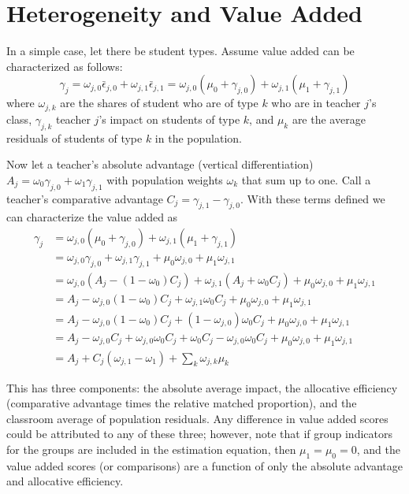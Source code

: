 \documentclass[letterpaper,12pt]{article}
\begin{document}
\section{Heterogeneity and Value Added}

In a simple case, let there be student types. Assume value added can be characterized as follows:
\[
\gamma_j = \omega_{j,0}\bar{\epsilon}_{j,0}  + \omega_{j,1}\bar{\epsilon}_{j,1} =  \omega_{j,0}(\mu_0 +\gamma_{j,0}) + \omega_{j,1}(\mu_1 +\gamma_{j,1})
\]
\noindent where $\omega_{j,k}$ are the shares of student who are of type $k$ who are in teacher $j$'s class, $\gamma_{j,k}$ teacher $j$'s  impact on students of type $k$, and $\mu_k$ are the average residuals of students of type $k$ in the population.

Now let a teacher's absolute advantage (vertical differentiation) $A_j = \omega_{0}\gamma_{j,0} + \omega_{1}\gamma_{j,1}$ with population  weights $\omega_{k}$ that sum up to one. Call a teacher's comparative advantage $C_j = \gamma_{j,1} - \gamma_{j,0}$. With these terms defined we can characterize the value added as
\begin{align*}
    \gamma_j  &= \omega_{j,0}(\mu_0 +\gamma_{j,0}) + \omega_{j,1}(\mu_1 +\gamma_{j,1})  \\
              & =  \omega_{j,0}\gamma_{j,0} + \omega_{j,1}\gamma_{j,1}   +\mu_0 \omega_{j,0} + \mu_1 \omega_{j,1}  \\
              & =  \omega_{j,0}(A_j -(1-\omega_{0})C_j) + \omega_{j,1}(A_j +\omega_{0}C_j)  +\mu_0 \omega_{j,0} + \mu_1 \omega_{j,1} \\
              & =  A_j   - \omega_{j,0} (1-\omega_{0})C_j + \omega_{j,1}\omega_{0}C_j +\mu_0 \omega_{j,0} + \mu_1 \omega_{j,1} \\
              & =  A_j   - \omega_{j,0} (1-\omega_{0})C_j + (1-\omega_{j,0})\omega_{0}C_j +\mu_0 \omega_{j,0} + \mu_1 \omega_{j,1} \\
              & =  A_j   - \omega_{j,0} C_j +\omega_{j,0}\omega_{0}C_j + \omega_{0}C_j -\omega_{j,0}\omega_{0}C_j +\mu_0 \omega_{j,0} + \mu_1 \omega_{j,1} \\
              & =  A_j  + C_j  ( \omega_{j,1} - \omega_{1} ) + \sum_k  \omega_{j,k} \mu_k
\end{align*}

This has three components: the absolute average impact, the allocative efficiency (comparative advantage times the relative matched proportion), and the classroom average of population residuals. Any difference in value added scores could be attributed to any of these three; however, note that if group indicators for the groups are included in the estimation equation, then $\mu_1 = \mu_0 = 0$, and the value added scores (or comparisons) are a function of only the absolute advantage and allocative efficiency.
\end{document}
